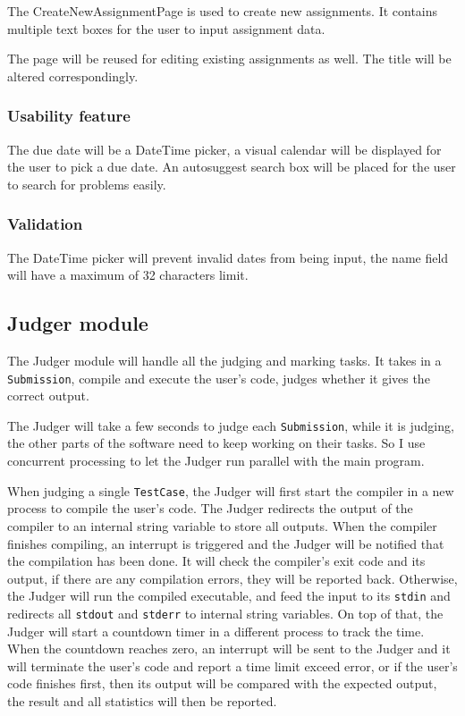 \documentclass[a4paper]{report}
\begin{document}
The CreateNewAssignmentPage is used to create new assignments. It contains multiple text boxes for the user to input assignment data.

The page will be reused for editing existing assignments as well. The title will be altered correspondingly.

\subsubsection{Usability feature}

The due date will be a DateTime picker, a visual calendar will be displayed for the user to pick a due date. An autosuggest search box will be placed for the user to search for problems easily.

\subsubsection{Validation}

The DateTime picker will prevent invalid dates from being input, the name field will have a maximum of 32 characters limit.

\subsection{Judger module}

The Judger module will handle all the judging and marking tasks. It takes in a \verb|Submission|, compile and execute the user's code, judges whether it gives the correct output.

The Judger will take a few seconds to judge each \verb|Submission|, while it is judging, the other parts of the software need to keep working on their tasks. So I use concurrent processing to let the Judger run parallel with the main program.

When judging a single \verb|TestCase|, the Judger will first start the compiler in a new process to compile the user's code. The Judger redirects the output of the compiler to an internal string variable to store all outputs. When the compiler finishes compiling, an interrupt is triggered and the Judger will be notified that the compilation has been done. It will check the compiler's exit code and its output, if there are any compilation errors, they will be reported back. Otherwise, the Judger will run the compiled executable, and feed the input to its \verb|stdin| and redirects all \verb|stdout| and \verb|stderr| to internal string variables. On top of that, the Judger will start a countdown timer in a different process to track the time. When the countdown reaches zero, an interrupt will be sent to the Judger and it will terminate the user's code and report a time limit exceed error, or if the user's code finishes first, then its output will be compared with the expected output, the result and all statistics will then be reported.
\end{document}
